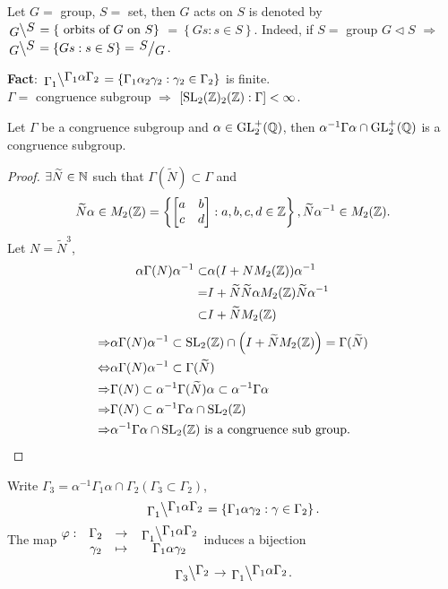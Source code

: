 \begin{remark}
  Let $G=$ group, $S=$ set, then $G$ acts on $S$ is denoted by $\bsfrac{G}{S}=\left\{ \text{ orbits of }G \text{ on }S\right\} $ $=\left\{Gs:s \in S\right\} $. Indeed, if $S=$ group $G\vartriangleleft S$ $\Rightarrow$ $\bsfrac{G}{S}=\left\{Gs:s \in S\right\} =\sfrac{S}{G}$.
\end{remark}
\textbf{Fact}: $\bsfrac{\Gamma_1}{\Gamma_1\alpha \Gamma_2}=\left\{\Gamma_1\alpha_2\gamma_2:\gamma_2 \in \Gamma_2\right\} $ is finite.\\
$\Gamma=$ congruence subgroup $\Rightarrow$ $\left[ \operatorname{SL}_2(\mathbb{Z})_2(\mathbb{Z}):\Gamma \right] <\infty$.

\begin{lemma}
  Let $\Gamma$ be a congruence subgroup and $\alpha \in \operatorname{GL}_2^{+}(\mathbb{Q})$, then $\alpha^{-1}\Gamma\alpha \cap \operatorname{GL}_2^{+}(\mathbb{Q})$ is a congruence subgroup.
\end{lemma}
\begin{proof}
  $\exists \widetilde{N}\in \mathbb{N}$ such that $\Gamma(\widetilde{N})\subset \Gamma$ and
  \[
    \widetilde{N}\alpha\in M_2(\mathbb{Z})=\left\{\begin{bmatrix} a&b\\c&d \end{bmatrix} :a,b,c,d \in \mathbb{Z}\right\}, \widetilde{N}\alpha^{-1}\in  M_2(\mathbb{Z}).
  \]
  Let $N=\widetilde{N}^3$,
  \begin{align*}
    \alpha \Gamma(N)\alpha^{-1}\subset & \alpha(I+NM_2(\mathbb{Z}))\alpha^{-1}\\
    =& I+ \widetilde{N}\widetilde{N}\alpha M_2(\mathbb{Z})\widetilde{N}\alpha^{-1}\\
    \subset & I+\widetilde{N}M_2(\mathbb{Z})
  \end{align*}
  \begin{align*}
    \Rightarrow&\alpha\Gamma(N)\alpha^{-1}\subset \operatorname{SL}_2(\mathbb{Z})\cap \left( I+\widetilde{N}M_2(\mathbb{Z}) \right)=\Gamma(\widetilde{N})\\
    \Leftrightarrow & \alpha \Gamma(N)\alpha^{-1}\subset \Gamma(\widetilde{N})\\
    \Rightarrow& \Gamma(N)\subset \alpha^{-1}\Gamma(\widetilde{N})\alpha\subset \alpha^{-1}\Gamma\alpha\\
    \Rightarrow& \Gamma(N)\subset \alpha^{-1}\Gamma\alpha \cap \operatorname{SL}_2(\mathbb{Z})\\
    \Rightarrow& \alpha^{-1}\Gamma\alpha \cap \operatorname{SL}_2(\mathbb{Z}) \text{ is a congruence sub group}
  .\end{align*}
\end{proof}
\begin{lemma}
  Write $\Gamma_3=\alpha^{-1}\Gamma_1\alpha \cap \Gamma_2 \left( \Gamma_3\subset \Gamma_2 \right) $,
  \[
  \bsfrac{\Gamma_1}{\Gamma_1\alpha\Gamma_2}=\left\{\Gamma_1\alpha\gamma_2:\gamma \in \Gamma_2\right\}. 
  \] 
  The map  $\begin{matrix}\varphi:& \Gamma_2 & \to & \bsfrac{\Gamma_1}{\Gamma_1\alpha\Gamma_2}\\&\gamma_2 & \mapsto &\Gamma_1\alpha\gamma_2 \end{matrix} $ induces a bijection
  \[
  \bsfrac{\Gamma_3}{\Gamma_2}\to \bsfrac{\Gamma_1}{\Gamma_1\alpha \Gamma_2}.
  \] 
\end{lemma}
